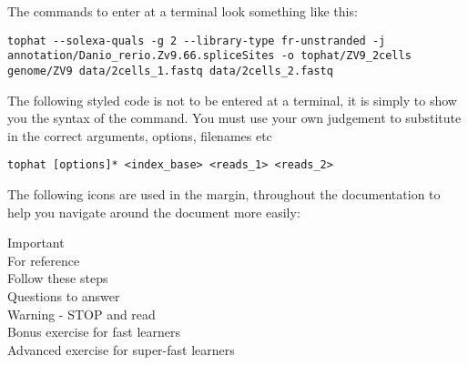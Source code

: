The commands to enter at a terminal look something like this:
\begin{lstlisting}
tophat --solexa-quals -g 2 --library-type fr-unstranded -j annotation/Danio_rerio.Zv9.66.spliceSites -o tophat/ZV9_2cells genome/ZV9 data/2cells_1.fastq data/2cells_2.fastq
\end{lstlisting}  

The following styled code is not to be entered at a terminal, it is simply to show you the syntax of
the command. You must use your own judgement to substitute in the correct arguments, options,
filenames etc

\begin{lstlisting}[style=command_syntax]
tophat [options]* <index_base> <reads_1> <reads_2>
\end{lstlisting}

The following icons are used in the margin, throughout the documentation to help you navigate around
the document more easily:

\hspace*{.2cm} Important\\
\hspace*{.2cm} For reference\\
\hspace*{.2cm} Follow these steps\\
\hspace*{.2cm} Questions to answer\\
\hspace*{.2cm} Warning - STOP and read\\
\hspace*{.2cm} Bonus exercise for fast learners\\
\hspace*{.2cm} Advanced exercise for super-fast learners\\
